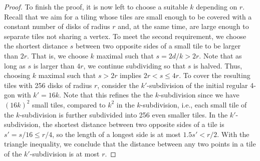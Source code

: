 \begin{proof}
%
%
    To finish the proof, it is now left to choose a suitable $ k $ depending on $ r $.
    Recall that we aim for a tiling whose tiles are small enough to be covered with a constant number of disks of radius $ r $ and, at the same time, are large enough to separate tiles not sharing a vertex.
    To meet the second requirement, we choose the shortest distance $ s $ between two opposite sides of a small tile to be larger than $ 2r $.
    That is, we choose $ k $ maximal such that $ s = 2d / k > 2r $.
    Note that as long as $s$ is larger than $4r$, we continue subdividing so that $s$ is halved.
    Thus, choosing $k$ maximal such that $s > 2r$ implies $2r < s \le 4r$.
%
    To cover the resulting tiles with 256 disks of radius $ r $, consider the $ k' $-subdivision of the initial regular 4-gon with $ k' = 16 k $.
    Note that this refines the the $ k $-subdivision since we have $ (16 k)^2 $ small tiles, compared to $ k^2 $ in the $ k $-subdivision, i.e., each small tile of the $ k $-subdivision is further subdivided into 256 even smaller tiles.
    In the $ k' $-subdivision, the shortest distance between two opposite sides of a tile is $ s' = s / 16 \leq r / 4 $, so the length of a longest side is at most $ 1.5 s' < r / 2 $.
    With the triangle inequality, we conclude that the distance between any two points in a tile of the $ k' $-subdivision is at most $ r $.

\end{proof}
